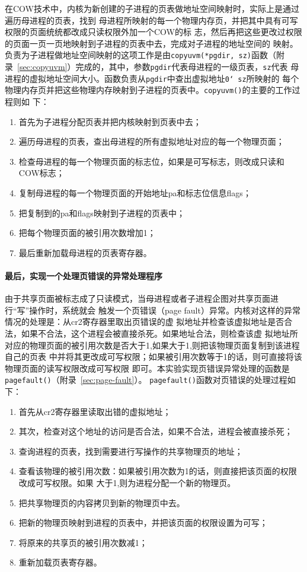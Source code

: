 \documentclass{swfuthesism}
\begin{document}
在COW技术中，内核为新创建的子进程的页表做地址空间映射时，实际上是通过遍历母进程的页表，找到
母进程所映射的每一个物理内存页，并把其中具有可写权限的页面统统都改成只读权限外加一个COW的标
志，然后再把这些更改过权限的页面一页一页地映射到子进程的页表中去，完成对子进程的地址空间的
映射。负责为子进程做地址空间映射的这项工作是由\texttt{copyuvm(*pgdir, sz)}函数（附
录~\ref{sec:copyuvm}）完成的，其中，参数\texttt{pgdir}代表母进程的一级页表，\texttt{sz}代表
母进程的虚拟地址空间大小。函数负责从\texttt{pgdir}中查出虚拟地址\texttt{0\char`~sz}所映射的
每个物理内存页并把这些物理内存映射到子进程的页表中。\texttt{copyuvm()}的主要的工作过程则如
下：
\begin{enumerate}
\item 首先为子进程分配页表并把内核映射到页表中去；
\item 遍历母进程的页表，查出母进程的所有虚拟地址对应的每一个物理页面； 
\item 检查母进程的每一个物理页面的标志位，如果是可写标志，则改成只读和COW标志；
\item 复制母进程的每一个物理页面的开始地址pa和标志位信息flags；
\item 把复制到的pa和flags映射到子进程的页表中；
\item 把每个物理页面的被引用次数增加1；
\item 最后重新加载母进程的页表寄存器。
\end{enumerate}

\paragraph{最后，实现一个处理页错误的异常处理程序}

由于共享页面被标志成了只读模式，当母进程或者子进程企图对共享页面进行``写''操作时，系统就会
触发一个页错误（page fault）异常。内核对这样的异常情况的处理是：从cr2寄存器里取出页错误的虚
拟地址并检查该虚拟地址是否合法，如果不合法，这个进程会被直接杀死。如果地址合法，则检查该虚
拟地址所对应的物理页面的被引用次数是否大于1,如果大于1,则把该物理页面复制到该进程自己的页表
中并将其更改成可写权限；如果被引用次数等于1的话，则可直接将该物理页面的读写权限改成可写权限
即可。本实验实现页错误异常处理的函数是\texttt{pagefault()}（附录~\ref{sec:page-fault}）。
\texttt{pagefault()}函数对页错误的处理过程如下：
\begin{enumerate}
\item 首先从cr2寄存器里读取出错的虚拟地址；
\item 其次，检查对这个地址的访问是否合法，如果不合法，进程会被直接杀死；
\item 查询进程的页表，找到需要进行写操作的共享物理页的地址；
\item 查看该物理的被引用次数：如果被引用次数为1的话，则直接把该页面的权限改成可写权限。如果
  大于1,则为进程分配一个新的物理页。
\item 把共享物理页的内容拷贝到新的物理页中去。
\item 把新的物理页映射到进程的页表中，并把该页面的权限设置为可写；
\item 将原来的共享页的被引用次数减1；
\item 重新加载页表寄存器。
\end{enumerate}
\end{document}
